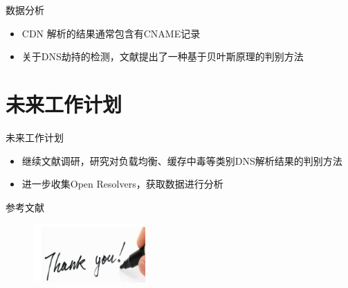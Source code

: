 \documentclass{beamer}
\begin{document}
\begin{frame}{数据分析}

  \begin{itemize}
    \item CDN 解析的结果通常包含有CNAME记录
    \item 关于DNS劫持的检测，文献\cite{Yan2006}提出了一种基于贝叶斯原理的判别方法
  \end{itemize}

\end{frame}

\section{未来工作计划}

\begin{frame}{未来工作计划}

  \begin{itemize}
    \item 继续文献调研，研究对负载均衡、缓存中毒等类别DNS解析结果的判别方法
    \item 进一步收集Open Resolvers，获取数据进行分析
  \end{itemize}

\end{frame}


 \begin{frame}{参考文献}
  \scriptsize
  
\end{frame}

\begin{frame}
  \begin{figure}
    \includegraphics[height=2.23cm,width=4.29cm]{images/thank.jpg}
  \end{figure} 
\end{frame}
\end{document}
